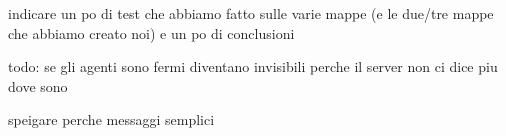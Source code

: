     indicare un po di test che abbiamo fatto sulle varie mappe (e le due/tre mappe che abbiamo creato noi) e un po di conclusioni
    
    todo: se gli agenti sono fermi diventano invisibili perche il server non ci dice piu dove sono 
    
    speigare perche messaggi semplici
